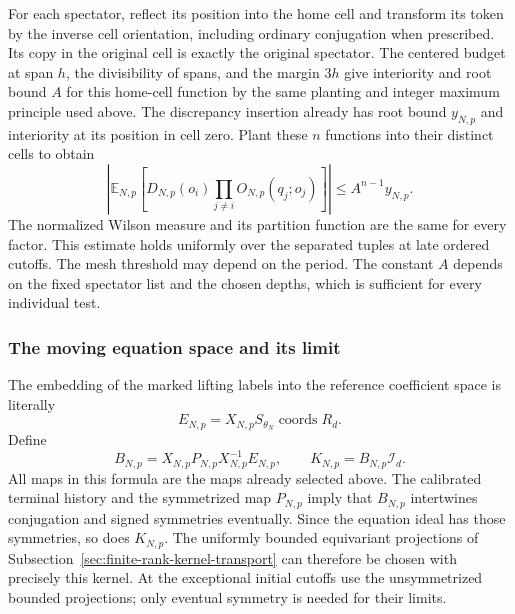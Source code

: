 For each spectator, reflect its position into the home cell and
transform its token by the inverse cell orientation, including ordinary
conjugation when prescribed. Its copy in the original cell is exactly
the original spectator. The centered budget at span $h$, the divisibility
of spans, and the margin $3h$ give interiority and root bound $A$ for
this home-cell function by the same planting and integer maximum
principle used above. The discrepancy insertion already has root bound
$y_{N,p}$ and interiority at its position in cell zero. Plant these
$n$ functions into their distinct cells to obtain
\begin{equation}\label{eq:equation-spectator-bound}
 \left|\mathbb E_{N,p}\left[
 D_{N,p}(o_i)\prod_{j\ne i}O_{N,p}(q_j;o_j)\right]\right|
                           \le A^{n-1}y_{N,p}.
\end{equation}
The normalized Wilson measure and its partition function are the same
for every factor. This estimate holds uniformly over the separated
tuples at late ordered cutoffs. The mesh threshold may depend on the
period. The constant $A$ depends on the fixed spectator list and the
chosen depths, which is sufficient for every individual test.

\subsubsection{The moving equation space and its limit}

The embedding of the marked lifting labels into the reference coefficient
space is literally
\[
                  E_{N,p}=X_{N,p}S_{\theta_N}\operatorname{coords}R_d.
\]
Define
\[
 B_{N,p}=X_{N,p}P_{N,p}X_{N,p}^{-1}E_{N,p},
                  \qquad K_{N,p}=B_{N,p}\mathcal I_d.
\]
All maps in this formula are the maps already selected above. The
calibrated terminal history and the symmetrized map $P_{N,p}$ imply
that $B_{N,p}$ intertwines conjugation and signed symmetries eventually.
Since the equation ideal has those symmetries, so does $K_{N,p}$.
The uniformly bounded equivariant projections of
Subsection~\ref{sec:finite-rank-kernel-transport} can therefore be chosen
with precisely this kernel. At the exceptional initial cutoffs use
the unsymmetrized bounded projections; only eventual symmetry is needed
for their limits.

